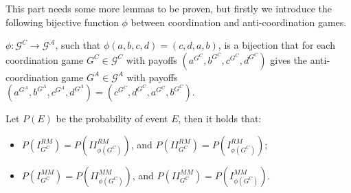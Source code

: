 \documentclass[fleqn,reqno,11pt]{article}
\begin{document}
\noindent This part needs some more lemmas to be proven, but firstly we introduce
the following bijective function $\phi$ between coordination and
anti-coordination games.

\medskip{}

\begin{definition}[$\phi$]
$\phi:\mathcal{G}^{C}\rightarrow\mathcal{G^{A}}$,
such that $\phi(a,b,c,d)=(c,d,a,b)$, is a bijection that for each
coordination game $G^{C}\in\mathcal{G}^{C}$ with payoffs $(a^{G^{C}},b^{G^{C}},c^{G^{C}},d^{G^{C}})$
gives the anti-coordination game $G^{A}\in\mathcal{G}^{A}$ with payoffs
$(a^{G^{A}},b^{G^{A}},c^{G^{A}},d^{G^{A}})=(c^{G^{C}},d^{G^{C}},a^{G^{C}},b^{G^{C}})$.
\end{definition}

\medskip{}

\begin{lemma}
Let $P(E)$ be the probability of event $E$, then
it holds that:
\begin{itemize}
\item $P(I_{G^{C}}^{RM})=P(II_{\phi(G^{C})}^{RM})$, and $P(II_{G^{C}}^{RM})=P(I_{\phi(G^{C})}^{RM})$;
\item $P(I_{G^{C}}^{MM})=P(II_{\phi(G^{C})}^{MM})$, and $P(II_{G^{C}}^{MM})=P(I_{\phi(G^{C})}^{MM})$.
\end{itemize}
\end{lemma}
\end{document}
